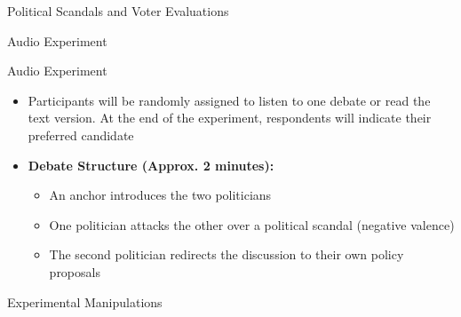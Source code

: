 \documentclass[9pt, aspectratio=169]{beamer}
\begin{document}
\begin{section} {Political Scandals and Voter Evaluations}
\begin{subsection}{Audio Experiment}
\begin{frame}{Audio Experiment}
\begin{itemize}
\item Participants will be randomly assigned to listen to one debate or read the text version. At the end of the experiment, respondents will indicate their preferred candidate \vspace{0.3cm}
\item \textbf{Debate Structure (Approx. 2 minutes):} \vspace{0.2cm}
\begin{itemize}
\item An anchor introduces the two politicians \vspace{0.2cm}
\item One politician attacks the other over a political scandal (negative valence) \vspace{0.2cm}
\item The second politician redirects the discussion to their own policy proposals \vspace{0.2cm}
\end{itemize}

\end{itemize}
\end{frame}


\begin{frame}{Experimental Manipulations}
\begin{table}[!h]
\centering
{}
\end{table}
\end{frame}
\end{subsection}
\end{section}
\end{document}
